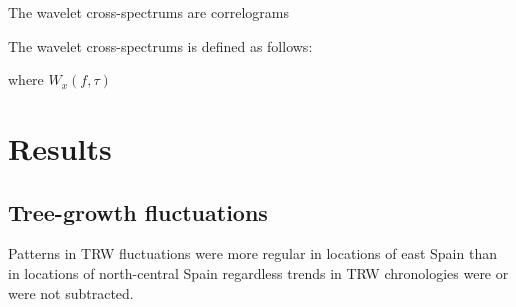 \documentclass[review,authoryear]{elsarticle}
\begin{document}
The wavelet cross-spectrums are correlograms

The wavelet
cross-spectrums is defined as follows:


where $W_{x}(f,\tau)$





\section{Results}
\subsection{Tree-growth fluctuations}
Patterns in \gls{TRW} fluctuations were more regular in locations
of east Spain than in locations of north-central Spain regardless
trends in \gls{TRW} chronologies were or were not subtracted.
\end{document}
